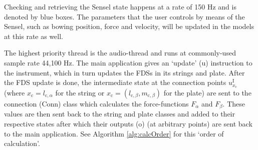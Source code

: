 Checking and retrieving the Sensel state happens at a rate of 150 Hz and is denoted by blue boxes. The parameters that the user controls by means of the Sensel, such as bowing position, force and velocity, will be updated in the models at this rate as well.

The highest priority thread is the audio-thread and runs at commonly-used sample rate 44,100 Hz. The main application gives an `update' (u) instruction to the instrument, which in turn updates the FDSs in its strings and plate. After the FDS update is done, the intermediate state at the connection points $u^\text{I}_{x_\text{c}}$ (where $x_\text{c} = l_{\text{c},\alpha}$ for the string or $x_\text{c} = (l_{\text{c},\beta}, m_{\text{c},\beta})$ for the plate) are sent to the connection (Conn) class which calculates the force-functions $F_\alpha$ and $F_\beta$. These values are then sent back to the string and plate classes and added to their respective states after which their outputs (o) (at arbitrary points) are sent back to the main application. See Algorithm \ref{alg:calcOrder} for this `order of calculation'.
